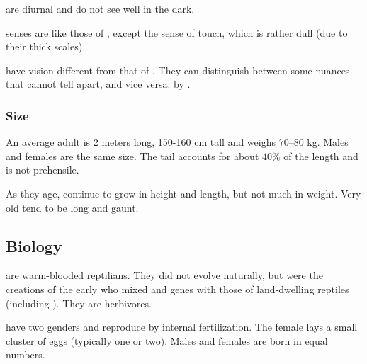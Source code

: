 \Scathae{} are diurnal and do not see well in the dark. 

\Scathaese{} senses are like those of \humans, except the sense of touch, which is rather dull (due to their thick scales). 

\Scathae{} have \colour vision different from that of \humans. They can distinguish between some nuances that \humans{} cannot tell apart, and vice versa.  by .





\subsubsection{Size}
An average adult \scatha{} is 2 meters long, 150-160 cm tall and weighs 70--80 kg. 
Males and females are the same size. 
The tail accounts for about $40\%$ of the length and is not prehensile. 

As they age, \scathae{} continue to grow in height and length, but not much in weight. Very old \scathae{} tend to be long and gaunt. 









\subsection{Biology}

\Scathae{} are warm-blooded reptilians. They did not evolve naturally, but were the creations of the early \dragonlords{} who mixed \dragon{} and \naga{} genes with those of land-dwelling reptiles (including \nycans{}). They are herbivores. 

\Scathae{} have two genders and reproduce by internal fertilization. The female lays a small cluster of eggs (typically one or two). Males and females are born in equal numbers. 

